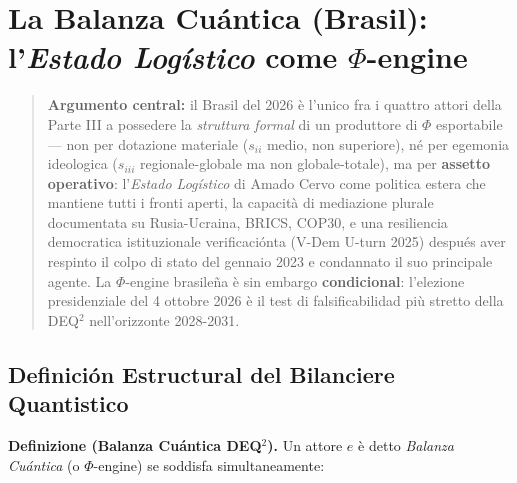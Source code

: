 \chapter{\texorpdfstring{La Balanza Cuántica (Brasil):
l'\emph{Estado Logístico} come
\(\Phi\)-engine}{La Balanza Cuántica (Brasil): l'Estado Logístico come \textbackslash Phi-engine}}\label{il-bilanciere-quantistico-brasile-lestado-loguxedstico-come-phi-engine}

\begin{quote}
\textbf{Argumento central:} il Brasil del 2026 è l'unico fra i quattro
attori della Parte III a possedere la \emph{struttura formal} di un
produttore di \(\Phi\) esportabile --- non per dotazione materiale
(\(s_{ii}\) medio, non superiore), né per egemonia ideologica
(\(s_{iii}\) regionale-globale ma non globale-totale), ma per
\textbf{assetto operativo}: l'\emph{Estado Logístico} di Amado Cervo
come politica estera che mantiene tutti i fronti aperti, la capacità di
mediazione plurale documentata su Rusia-Ucraina, BRICS, COP30, e una
resiliencia democratica istituzionale verificaciónta (V-Dem U-turn 2025) después
aver respinto il colpo di stato del gennaio 2023 e condannato il suo
principale agente. La \(\Phi\)-engine brasileña è sin embargo
\textbf{condicional}: l'elezione presidenziale del 4 ottobre 2026 è il
test di falsificabilidad più stretto della DEQ$^2$ nell'orizzonte 2028-2031.
\end{quote}



\section{Definición Estructural del Bilanciere
Quantistico}\label{definición-estructural-del-bilanciere-quantistico}

\Hypoth{} \textbf{Definizione (Balanza Cuántica DEQ$^2$).} Un attore
\(e\) è detto \emph{Balanza Cuántica} (o \(\Phi\)-engine) se
soddisfa simultaneamente:


